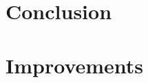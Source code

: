 \documentclass[a4paper,11pt,singlespacing]{article}
\begin{document}
\section{Conclusion}
\section{Improvements}


\pagebreak
\listoffigures
\pagebreak
\printbibliography[heading=bibintoc]
\pagebreak
\lstlistoflistings
\pagebreak




\end{document}
